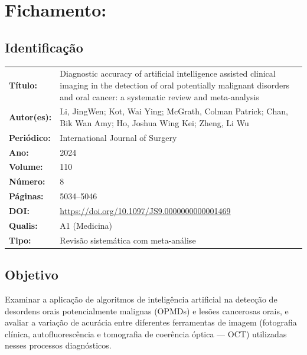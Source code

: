 \section{Fichamento: }

\subsection{Identificação}
\begin{tabular}{ll}
\textbf{Título:} & Diagnostic accuracy of artificial intelligence assisted
clinical imaging in the detection of oral potentially malignant disorders
and oral cancer: a systematic review and meta-analysis \\
\textbf{Autor(es):} & Li, JingWen; Kot, Wai Ying; McGrath, Colman Patrick;
Chan, Bik Wan Amy; Ho, Joshua Wing Kei; Zheng, Li Wu \\
\textbf{Periódico:} & International Journal of Surgery \\
\textbf{Ano:} & 2024 \\
\textbf{Volume:} & 110 \\
\textbf{Número:} & 8 \\
\textbf{Páginas:} & 5034--5046 \\
\textbf{DOI:} & \url{https://doi.org/10.1097/JS9.0000000000001469} \\
\textbf{Qualis:} & A1 (Medicina) \\
\textbf{Tipo:} & Revisão sistemática com meta-análise \\
\end{tabular}

\subsection{Objetivo}
Examinar a aplicação de algoritmos de inteligência artificial na detecção de
desordens orais potencialmente malignas (OPMDs) e lesões cancerosas orais, e
avaliar a variação de acurácia entre diferentes ferramentas de imagem
(fotografia clínica, autofluorescência e tomografia de coerência óptica — OCT)
utilizadas nesses processos diagnósticos.

